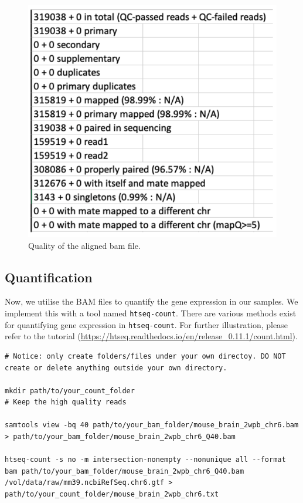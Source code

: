 \documentclass[
]{book}
\begin{document}
\begin{figure}
\centering
\includegraphics{figures/flagstat.png}
\caption{Quality of the aligned bam file.}
\end{figure}

\hypertarget{quantification}{%
\subsection{Quantification}\label{quantification}}

Now, we utilise the BAM files to quantify the gene expression in our samples. We implement this with a tool named \texttt{htseq-count}. There are various methods exist for quantifying gene expression in \texttt{htseq-count}. For further illustration, please refer to the tutorial (\url{https://htseq.readthedocs.io/en/release_0.11.1/count.html}).

\begin{verbatim}
# Notice: only create folders/files under your own directoy. DO NOT create or delete anything outside your own directory.

mkdir path/to/your_count_folder
# Keep the high quality reads

samtools view -bq 40 path/to/your_bam_folder/mouse_brain_2wpb_chr6.bam > path/to/your_bam_folder/mouse_brain_2wpb_chr6_Q40.bam

htseq-count -s no -m intersection-nonempty --nonunique all --format bam path/to/your_bam_folder/mouse_brain_2wpb_chr6_Q40.bam /vol/data/raw/mm39.ncbiRefSeq.chr6.gtf > path/to/your_count_folder/mouse_brain_2wpb_chr6.txt
\end{verbatim}
\end{document}
